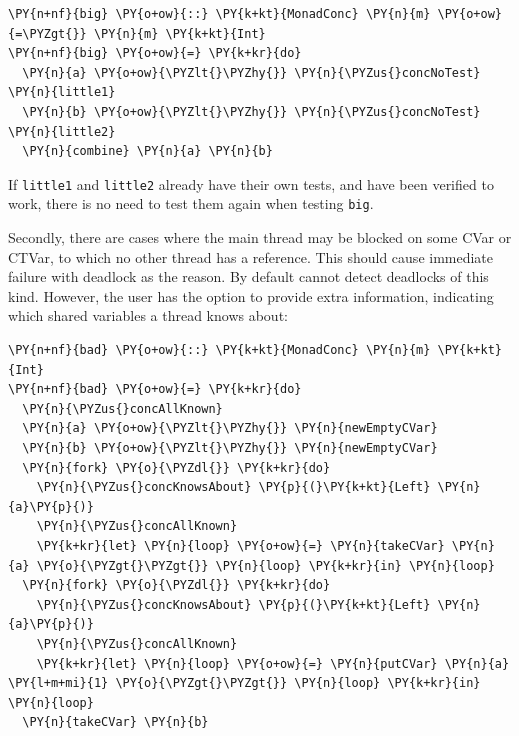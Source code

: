 
\begin{Verbatim}[commandchars=\\\{\}]
\PY{n+nf}{big} \PY{o+ow}{::} \PY{k+kt}{MonadConc} \PY{n}{m} \PY{o+ow}{=\PYZgt{}} \PY{n}{m} \PY{k+kt}{Int}
\PY{n+nf}{big} \PY{o+ow}{=} \PY{k+kr}{do}
  \PY{n}{a} \PY{o+ow}{\PYZlt{}\PYZhy{}} \PY{n}{\PYZus{}concNoTest} \PY{n}{little1}
  \PY{n}{b} \PY{o+ow}{\PYZlt{}\PYZhy{}} \PY{n}{\PYZus{}concNoTest} \PY{n}{little2}
  \PY{n}{combine} \PY{n}{a} \PY{n}{b}
\end{Verbatim}

If \texttt{little1} and \texttt{little2} already have their own tests,
and have been verified to work, there is no need to test them again
when testing \texttt{big}.

Secondly, there are cases where the main thread may be blocked on some
CVar or CTVar, to which no other thread has a reference. This should
cause immediate failure with deadlock as the reason. By default
\dejafu{} cannot detect deadlocks of this kind. However, the user has
the option to provide extra information, indicating which shared
variables a thread knows about:


\begin{Verbatim}[commandchars=\\\{\}]
\PY{n+nf}{bad} \PY{o+ow}{::} \PY{k+kt}{MonadConc} \PY{n}{m} \PY{k+kt}{Int}
\PY{n+nf}{bad} \PY{o+ow}{=} \PY{k+kr}{do}
  \PY{n}{\PYZus{}concAllKnown}
  \PY{n}{a} \PY{o+ow}{\PYZlt{}\PYZhy{}} \PY{n}{newEmptyCVar}
  \PY{n}{b} \PY{o+ow}{\PYZlt{}\PYZhy{}} \PY{n}{newEmptyCVar}
  \PY{n}{fork} \PY{o}{\PYZdl{}} \PY{k+kr}{do}
    \PY{n}{\PYZus{}concKnowsAbout} \PY{p}{(}\PY{k+kt}{Left} \PY{n}{a}\PY{p}{)}
    \PY{n}{\PYZus{}concAllKnown}
    \PY{k+kr}{let} \PY{n}{loop} \PY{o+ow}{=} \PY{n}{takeCVar} \PY{n}{a} \PY{o}{\PYZgt{}\PYZgt{}} \PY{n}{loop} \PY{k+kr}{in} \PY{n}{loop}
  \PY{n}{fork} \PY{o}{\PYZdl{}} \PY{k+kr}{do}
    \PY{n}{\PYZus{}concKnowsAbout} \PY{p}{(}\PY{k+kt}{Left} \PY{n}{a}\PY{p}{)}
    \PY{n}{\PYZus{}concAllKnown}
    \PY{k+kr}{let} \PY{n}{loop} \PY{o+ow}{=} \PY{n}{putCVar} \PY{n}{a} \PY{l+m+mi}{1} \PY{o}{\PYZgt{}\PYZgt{}} \PY{n}{loop} \PY{k+kr}{in} \PY{n}{loop}
  \PY{n}{takeCVar} \PY{n}{b}
\end{Verbatim}

